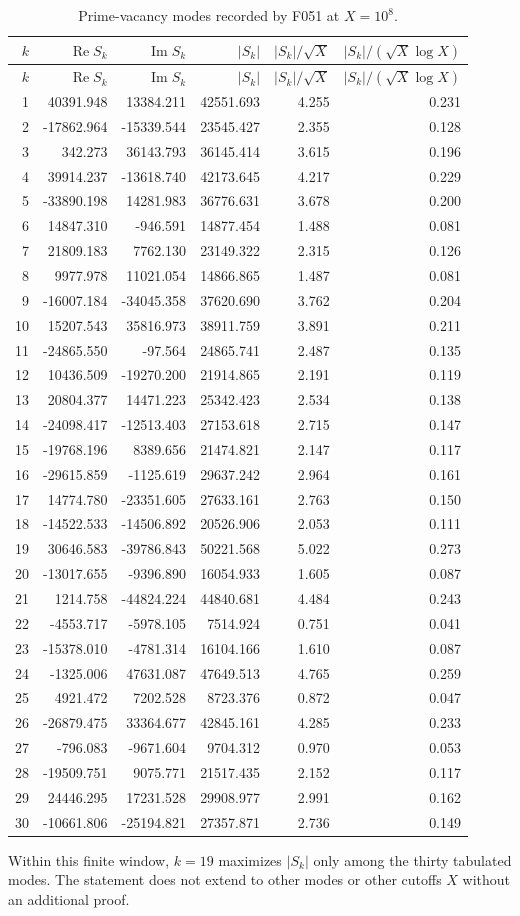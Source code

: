 \begingroup
\scriptsize
\setlength{\tabcolsep}{3.1pt}
\renewcommand{\arraystretch}{1.08}
\begin{longtable}{@{}r r r r r r@{}}
\caption{Prime-vacancy modes recorded by F051 at \(X=10^8\).}
\label{v:f051:tab:all-modes}\\
\toprule
\(k\)&\(\operatorname{Re}S_k\)&\(\operatorname{Im}S_k\)&\(|S_k|\)&\(|S_k|/\sqrt X\)&\(|S_k|/(\sqrt X\log X)\)\\
\midrule
\endfirsthead
\toprule
\(k\)&\(\operatorname{Re}S_k\)&\(\operatorname{Im}S_k\)&\(|S_k|\)&\(|S_k|/\sqrt X\)&\(|S_k|/(\sqrt X\log X)\)\\
\midrule
\endhead
1&40391.948&13384.211&42551.693&4.255&0.231\\
2&-17862.964&-15339.544&23545.427&2.355&0.128\\
3&342.273&36143.793&36145.414&3.615&0.196\\
4&39914.237&-13618.740&42173.645&4.217&0.229\\
5&-33890.198&14281.983&36776.631&3.678&0.200\\
6&14847.310&-946.591&14877.454&1.488&0.081\\
7&21809.183&7762.130&23149.322&2.315&0.126\\
8&9977.978&11021.054&14866.865&1.487&0.081\\
9&-16007.184&-34045.358&37620.690&3.762&0.204\\
10&15207.543&35816.973&38911.759&3.891&0.211\\
11&-24865.550&-97.564&24865.741&2.487&0.135\\
12&10436.509&-19270.200&21914.865&2.191&0.119\\
13&20804.377&14471.223&25342.423&2.534&0.138\\
14&-24098.417&-12513.403&27153.618&2.715&0.147\\
15&-19768.196&8389.656&21474.821&2.147&0.117\\
16&-29615.859&-1125.619&29637.242&2.964&0.161\\
17&14774.780&-23351.605&27633.161&2.763&0.150\\
18&-14522.533&-14506.892&20526.906&2.053&0.111\\
19&30646.583&-39786.843&50221.568&5.022&0.273\\
20&-13017.655&-9396.890&16054.933&1.605&0.087\\
21&1214.758&-44824.224&44840.681&4.484&0.243\\
22&-4553.717&-5978.105&7514.924&0.751&0.041\\
23&-15378.010&-4781.314&16104.166&1.610&0.087\\
24&-1325.006&47631.087&47649.513&4.765&0.259\\
25&4921.472&7202.528&8723.376&0.872&0.047\\
26&-26879.475&33364.677&42845.161&4.285&0.233\\
27&-796.083&-9671.604&9704.312&0.970&0.053\\
28&-19509.751&9075.771&21517.435&2.152&0.117\\
29&24446.295&17231.528&29908.977&2.991&0.162\\
30&-10661.806&-25194.821&27357.871&2.736&0.149\\
\bottomrule
\end{longtable}
\endgroup

Within this finite window, \(k=19\) maximizes \(|S_k|\) only among the thirty
tabulated modes. The statement does not extend to other modes or other cutoffs
\(X\) without an additional proof.
